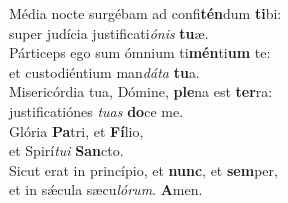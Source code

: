 \evenverse Média nocte surgébam ad confi\textbf{tén}dum \textbf{ti}bi:~\*\\
\evenverse super judícia justificati\textit{ó}\textit{nis} \textbf{tu}æ.\\
\oddverse Párticeps ego sum ómnium ti\textbf{mén}ti\textbf{um} te:~\*\\
\oddverse et custodiéntium man\textit{dá}\textit{ta} \textbf{tu}a.\\
\evenverse Misericórdia tua, Dómine, \textbf{ple}na est \textbf{ter}ra:~\*\\
\evenverse justificatiónes \textit{tu}\textit{as} \textbf{do}ce me.\\
\oddverse Glória \textbf{Pa}tri, et \textbf{Fí}lio,~\*\\
\oddverse et Spirí\textit{tu}\textit{i} \textbf{San}cto.\\
\evenverse Sicut erat in princípio, et \textbf{nunc}, et \textbf{sem}per,~\*\\
\evenverse et in sǽcula sæcu\textit{ló}\textit{rum}. \textbf{A}men.\\
